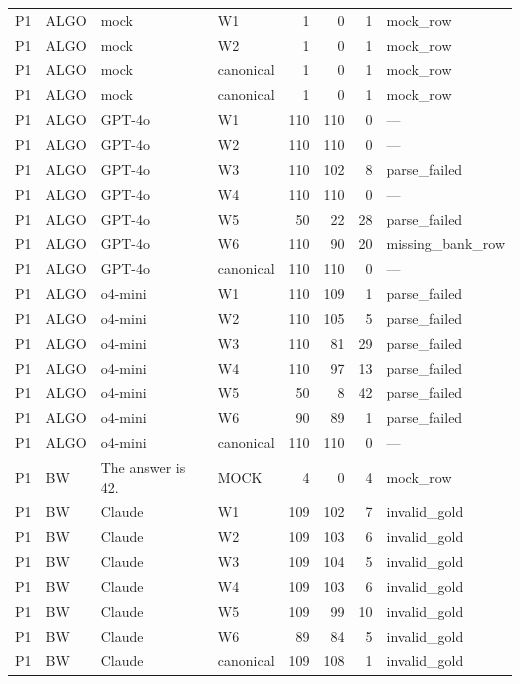 \begin{table}[t]
\begin{tabular}{llllrrrl}
    P1 & ALGO & mock & W1 & 1 & 0 & 1 & mock\_row \\
    P1 & ALGO & mock & W2 & 1 & 0 & 1 & mock\_row \\
    P1 & ALGO & mock & canonical & 1 & 0 & 1 & mock\_row \\
    P1 & ALGO & mock & canonical & 1 & 0 & 1 & mock\_row \\
    P1 & ALGO & GPT-4o & W1 & 110 & 110 & 0 & --- \\
    P1 & ALGO & GPT-4o & W2 & 110 & 110 & 0 & --- \\
    P1 & ALGO & GPT-4o & W3 & 110 & 102 & 8 & parse\_failed \\
    P1 & ALGO & GPT-4o & W4 & 110 & 110 & 0 & --- \\
    P1 & ALGO & GPT-4o & W5 & 50 & 22 & 28 & parse\_failed \\
    P1 & ALGO & GPT-4o & W6 & 110 & 90 & 20 & missing\_bank\_row \\
    P1 & ALGO & GPT-4o & canonical & 110 & 110 & 0 & --- \\
    P1 & ALGO & o4-mini & W1 & 110 & 109 & 1 & parse\_failed \\
    P1 & ALGO & o4-mini & W2 & 110 & 105 & 5 & parse\_failed \\
    P1 & ALGO & o4-mini & W3 & 110 & 81 & 29 & parse\_failed \\
    P1 & ALGO & o4-mini & W4 & 110 & 97 & 13 & parse\_failed \\
    P1 & ALGO & o4-mini & W5 & 50 & 8 & 42 & parse\_failed \\
    P1 & ALGO & o4-mini & W6 & 90 & 89 & 1 & parse\_failed \\
    P1 & ALGO & o4-mini & canonical & 110 & 110 & 0 & --- \\
    P1 & BW & The answer is 42. & MOCK & 4 & 0 & 4 & mock\_row \\
    P1 & BW & Claude & W1 & 109 & 102 & 7 & invalid\_gold \\
    P1 & BW & Claude & W2 & 109 & 103 & 6 & invalid\_gold \\
    P1 & BW & Claude & W3 & 109 & 104 & 5 & invalid\_gold \\
    P1 & BW & Claude & W4 & 109 & 103 & 6 & invalid\_gold \\
    P1 & BW & Claude & W5 & 109 & 99 & 10 & invalid\_gold \\
    P1 & BW & Claude & W6 & 89 & 84 & 5 & invalid\_gold \\
    P1 & BW & Claude & canonical & 109 & 108 & 1 & invalid\_gold \\

\end{tabular}
\end{table}
